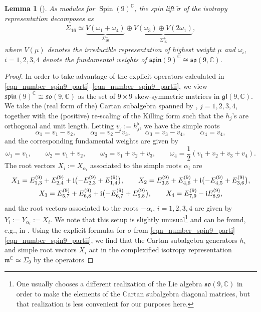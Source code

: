 \documentclass[pdftex]{sigma}
\numberwithin{equation}{section}
\newtheorem{Lemma}[Theorem]{Lemma}
\newcommand{\C}{\mathbb{C}} %
\DeclareMathOperator{\Spin}{Spin}
\begin{document}
		\begin{Lemma}[{\cite{Fri01_weak_spin9}}]\label{Sigma16_decomp_lemma}
			 As modules for $\Spin(9)^{\C}$, the spin lift $\widetilde{\sigma}$ of the isotropy representation decomposes as
			\begin{align}\label{Sigma16_decomp}
				\Sigma_{16} \simeq \underbrace{V(\omega_1+\omega_4)}_{\Sigma_{16}^-} \oplus \underbrace{V(\omega_3) \oplus V(2\omega_1)}_{\Sigma_{16}^+},
			\end{align}
			where $V(\mu)$ denotes the irreducible representation of highest weight $\mu$ and $\omega_i$, $i=1,2,3,4$ denote the fundamental weights of $\mathfrak{spin}(9)^{\C} \cong \mathfrak{so}(9,\C)$.
		\end{Lemma}
		\begin{proof}
			In order to take advantage of the explicit operators calculated in \eqref{eqn_number_spin9_parti}--\eqref{eqn_number_spin9_partii}, we view~$ { \mathfrak{spin}(9)^{\C}\cong \mathfrak{so}(9,\C)}$ as the set of $9\times 9$ skew-symmetric matrices in $\mathfrak{gl}(9,\C)$. We take the (real form of the) Cartan subalgebra spanned by , $j=1,2,3,4$, together with the (positive) re-scaling of the Killing form such that the $h_j$'s are orthogonal and unit length. Letting $v_j:=h_j^{\flat}$, we have the simple roots \[\alpha_1=v_1-v_2, \qquad \alpha_2=v_2-v_3, \qquad \alpha_3=v_3-v_4,\qquad \alpha_4=v_4, \]
			and the corresponding fundamental weights  are given by
			\[
			\omega_1=v_1,\qquad \omega_2=v_1+v_2,\qquad \omega_3=v_1+v_2+v_3, \qquad \omega_4 = \frac{1}{2}(v_1+v_2+v_3+v_4).\]
			The root vectors $X_i:= X_{\alpha_i}$ associated to the simple roots $\alpha_i$ are
			\begin{gather*}
				X_{1}= E^{(9)}_{1, 3} + E^{(9)}_{2, 4} +
				{\rm i}\bigl(-E^{(9)}_{2, 3} + E^{(9)}_{1, 4}\bigr),\qquad
				X_{2} = E^{(9)}_{3, 5} + E^{(9)}_{4, 6} +
				{\rm i}\bigl(-E^{(9)}_{4, 5} + E^{(9)}_{3, 6}\bigr),\\
				X_{3} = E^{(9)}_{5, 7} + E^{(9)}_{6, 8} +
				{\rm i}\bigl(-E^{(9)}_{6, 7} + E^{(9)}_{5, 8}\bigr),\qquad
				X_{4} = E^{(9)}_{7, 9} - {\rm i}E^{(9)}_{8, 9},
			\end{gather*}
and the root vectors associated to the roots $-\alpha_i$, $i=1,2,3,4$ are given by $Y_i:=Y_{\alpha_i}:=\overline{X_{i}}$. We note that this setup is slightly unusual\footnote{One usually chooses a different realization of the Lie algebra $\mathfrak{so}(9,\C)$ in order to make the elements of the Cartan subalgebra diagonal matrices, but that realization is less convenient for our purposes here.} and can be found, e.g., in \cite{Ziller_2010}. Using the explicit formulas for $\sigma$ from \eqref{eqn_number_spin9_parti}--\eqref{eqn_number_spin9_partii}, we find that the Cartan subalgebra generators $h_i$ and simple root vectors $X_i$ act in the complexified isotropy representation $\mathfrak{m}^{\C}\simeq \Sigma_9$ by the operators

\end{proof}
\end{document}
